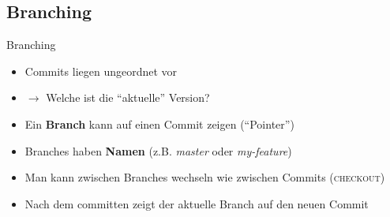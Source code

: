 \documentclass[compress,t,usenames,dvipsnames]{beamer}
\begin{document}
\subsection{Branching}
\begin{frame}{Branching}
    \begin{itemize}
        \item Commits liegen ungeordnet vor
        \item $\rightarrow$ Welche ist die ``aktuelle'' Version?
        \item Ein \textbf{Branch} kann auf einen Commit zeigen (``Pointer'')
        \item Branches haben \textbf{Namen} (z.B. \textit{master} oder \textit{my-feature})
        \item Man kann zwischen Branches wechseln wie zwischen Commits (\textsc{checkout})
        \item Nach dem committen zeigt der aktuelle Branch auf den neuen Commit
    \end{itemize}
\end{frame}
\end{document}
